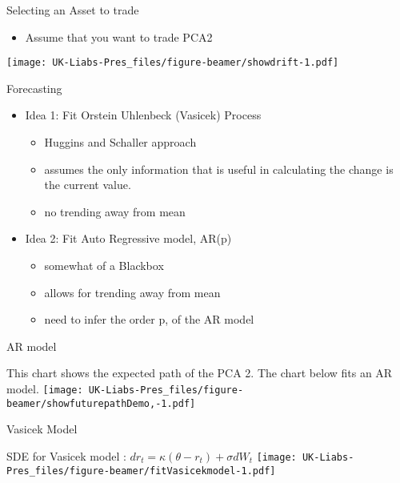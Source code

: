 \documentclass[ignorenonframetext,]{beamer}
\providecommand{\tightlist}{%
  \setlength{\itemsep}{0pt}\setlength{\parskip}{0pt}}
\begin{document}
\begin{frame}{Selecting an Asset to trade}
\protect\hypertarget{selecting-an-asset-to-trade}{}

\begin{itemize}
\tightlist
\item
  Assume that you want to trade PCA2
\end{itemize}

\texttt{[image: UK-Liabs-Pres\_files/figure-beamer/showdrift-1.pdf]}

\end{frame}

\begin{frame}{Forecasting}
\protect\hypertarget{forecasting}{}

\begin{itemize}
\tightlist
\item
  Idea 1: Fit Orstein Uhlenbeck (Vasicek) Process

  \begin{itemize}
  \tightlist
  \item
    Huggins and Schaller approach
  \item
    assumes the only information that is useful in calculating the
    change is the current value.
  \item
    no trending away from mean
  \end{itemize}
\item
  Idea 2: Fit Auto Regressive model, AR(p)

  \begin{itemize}
  \tightlist
  \item
    somewhat of a Blackbox
  \item
    allows for trending away from mean
  \item
    need to infer the order p, of the AR model
  \end{itemize}
\end{itemize}

\end{frame}

\begin{frame}{AR model}
\protect\hypertarget{ar-model}{}

This chart shows the expected path of the PCA 2. The chart below fits an
AR model.
\texttt{[image: UK-Liabs-Pres\_files/figure-beamer/showfuturepathDemo,-1.pdf]}

\end{frame}

\begin{frame}{Vasicek Model}
\protect\hypertarget{vasicek-model}{}

SDE for Vasicek model : \(dr_{t}= \kappa (\theta - r_t) + \sigma dW_t\)
\texttt{[image: UK-Liabs-Pres\_files/figure-beamer/fitVasicekmodel-1.pdf]}

\end{frame}
\end{document}
